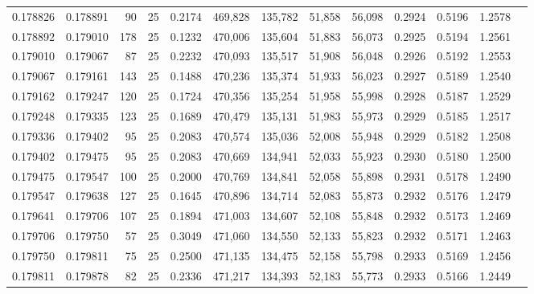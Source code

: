 \begin{tabular}{rrrrrrrrrrrrr}
0.178826 & 0.178891 &    90 &  25 &                                     0.2174 & 469,828 & 135,782 &  51,858 &  56,098 & 0.2924 & 0.5196 & 1.2578 \\
0.178892 & 0.179010 &   178 &  25 &                                     0.1232 & 470,006 & 135,604 &  51,883 &  56,073 & 0.2925 & 0.5194 & 1.2561 \\
0.179010 & 0.179067 &    87 &  25 &                                     0.2232 & 470,093 & 135,517 &  51,908 &  56,048 & 0.2926 & 0.5192 & 1.2553 \\
0.179067 & 0.179161 &   143 &  25 &                                     0.1488 & 470,236 & 135,374 &  51,933 &  56,023 & 0.2927 & 0.5189 & 1.2540 \\
0.179162 & 0.179247 &   120 &  25 &                                     0.1724 & 470,356 & 135,254 &  51,958 &  55,998 & 0.2928 & 0.5187 & 1.2529 \\
0.179248 & 0.179335 &   123 &  25 &                                     0.1689 & 470,479 & 135,131 &  51,983 &  55,973 & 0.2929 & 0.5185 & 1.2517 \\
0.179336 & 0.179402 &    95 &  25 &                                     0.2083 & 470,574 & 135,036 &  52,008 &  55,948 & 0.2929 & 0.5182 & 1.2508 \\
0.179402 & 0.179475 &    95 &  25 &                                     0.2083 & 470,669 & 134,941 &  52,033 &  55,923 & 0.2930 & 0.5180 & 1.2500 \\
0.179475 & 0.179547 &   100 &  25 &                                     0.2000 & 470,769 & 134,841 &  52,058 &  55,898 & 0.2931 & 0.5178 & 1.2490 \\
0.179547 & 0.179638 &   127 &  25 &                                     0.1645 & 470,896 & 134,714 &  52,083 &  55,873 & 0.2932 & 0.5176 & 1.2479 \\
0.179641 & 0.179706 &   107 &  25 &                                     0.1894 & 471,003 & 134,607 &  52,108 &  55,848 & 0.2932 & 0.5173 & 1.2469 \\
0.179706 & 0.179750 &    57 &  25 &                                     0.3049 & 471,060 & 134,550 &  52,133 &  55,823 & 0.2932 & 0.5171 & 1.2463 \\
0.179750 & 0.179811 &    75 &  25 &                                     0.2500 & 471,135 & 134,475 &  52,158 &  55,798 & 0.2933 & 0.5169 & 1.2456 \\
0.179811 & 0.179878 &    82 &  25 &                                     0.2336 & 471,217 & 134,393 &  52,183 &  55,773 & 0.2933 & 0.5166 & 1.2449 \\

\end{tabular}
